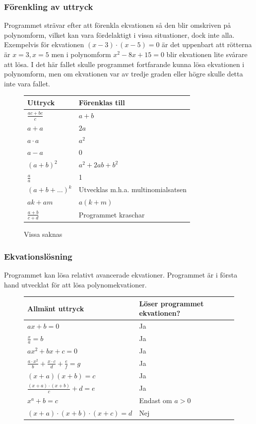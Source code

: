 \documentclass[12pt,a4paper]{article}
\begin{document}
\subsubsection{Förenkling av uttryck}
Programmet strävar efter att förenkla ekvationen så den blir omskriven på polynomform, vilket kan vara fördelaktigt i vissa situationer, dock inte alla. Exempelvis för ekvationen \((x-3) \cdot (x-5)=0\) är det uppenbart att rötterna är \(x=3, x=5\) men i polynomform \(x^{2}-8x+15=0\) blir ekvationen lite svårare att lösa. I det här fallet skulle programmet fortfarande kunna lösa ekvationen i polynomform, men om ekvationen var av tredje graden eller högre skulle detta inte vara fallet.
\begin{savenotes}
\begin{figure}[H]
  \centering
  \begin{tabular}{l|l}
    \textbf{Uttryck} & \textbf{Förenklas till} \\
    \hline
    \(\frac{ac + bc}{c}\) & \(a+b\) \\
    \(a+a\) & \(2a\) \\
    \(a \cdot a\) & \(a^{2}\) \\
    \(a - a\) & \(0\) \\
    \((a+b)^{2}\) & \(a^{2} + 2ab + b^{2}\) \\
    \(\frac{a}{a}\) & 1 \\
    \((a+b+\ldots)^{k}\) & Utvecklas m.h.a. multinomialsatsen \\
    \(ak+am\) & \(a(k+m)\) \\
    \(\frac{a+b}{c+d}\) & Programmet kraschar
  \end{tabular}
  \label{tab:expressions}Vissa saknas
\end{figure}
\end{savenotes}

\subsubsection{Ekvationslösning}
Programmet kan lösa relativt avancerade ekvationer. Programmet är i första hand utvecklat för att lösa polynomekvationer.

\begin{figure}[h!]
  \centering
  \begin{tabular}{l|l}
    \textbf{Allmänt uttryck} & \textbf{Löser programmet ekvationen?} \\
    \hline
    \(ax+b=0\) & Ja \\
    \(\frac{x}{a}=b\) & Ja \\
    \(ax^2+bx+c=0\) & Ja \\
    \(\frac{a \cdot x^2}{b}+\frac{x \cdot c}{d}+\frac{e}{f}=g\) & Ja \\
    \((x+a)(x+b)=c\) & Ja \\
    \(\frac{(x+a)\cdot(x+b)}{c}+d=e\) & Ja \\
    \(x^a+b=c\) & Endast om \( a>0 \) \\
    \((x+a)\cdot(x+b)\cdot(x+c)=d\) & Nej 
  \end{tabular}
  \label{tab:lexer_patterns}
\end{figure}
\end{document}
